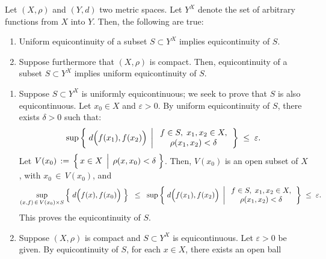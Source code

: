 \begin{proposition}
\label{CompactnessUniformEquicontinuity}
\mbox{}\vskip 0.2cm
\noindent
Let $(X,\rho)$ and $(Y,d)$ two metric spaces.
Let $Y^{X}$ denote the set of arbitrary functions from $X$ into $Y$.
Then, the following are true:
\begin{enumerate}
\item	Uniform equicontinuity of a subset $S \subset Y^{X}$ implies equicontinuity of $S$.
\item	Suppose furthermore that $(X,\rho)$ is compact.
		Then, equicontinuity of a subset $S \subset Y^{X}$ implies uniform equicontinuity of $S$.
\end{enumerate}
\end{proposition}
\proof
\begin{enumerate}
\item
	Suppose $S \subset Y^{X}$ is uniformly equicontinuous;
	we seek to prove that $S$ is also equicontinuous.
	Let $x_{0} \in X$ and $\varepsilon > 0$.
	By uniform equicontinuity of $S$, there exists $\delta > 0$ such that:
	\begin{equation*}
	\sup\left\{\;
	d\!\left(\overset{{\color{white}.}}{f}(x_{1}),f(x_{2})\right)
	\;\left\vert\;
	\begin{array}{c} f \in S, \; x_{1},x_{2} \in X, \\ \rho(x_{1},x_{2}) < \delta \end{array}
	\right.
	\right\}
	\;\leq\; \varepsilon.
	\end{equation*}
	Let $V(x_{0}) \,:=\, \left\{\,x \in X \;\left\vert\;\, \rho(x,x_{0}) \overset{{\color{white}.}}{<} \delta \right.\,\right\}$.
	Then, $V(x_{0})$ is an open subset of $X$, with $x_{0} \,\in\, V(x_{0})$, and
	\begin{equation*}
	\sup_{(x,f) \,\in\, V(x_{0}) \times S}\left\{\;d\!\left(\overset{{\color{white}.}}{f}(x),f(x_{0})\right)\;\right\}
	\;\; \leq \;\; 
	\sup\left\{\;
	d\!\left(\overset{{\color{white}.}}{f}(x_{1}),f(x_{2})\right)
	\;\left\vert\;
	\begin{array}{c} f \in S, \; x_{1},x_{2} \in X, \\ \rho(x_{1},x_{2}) < \delta \end{array}
	\right.
	\right\}
	\;\leq\; \varepsilon.
	\end{equation*}
	This proves the equicontinuity of $S$.
\item
	Suppose $(X,\rho)$ is compact and $S \subset Y^{X}$ is equicontinuous.
	Let $\varepsilon > 0$ be given.
	By equicontinuity of $S$, for each $x \in X$, there exists an open ball

\end{enumerate}
